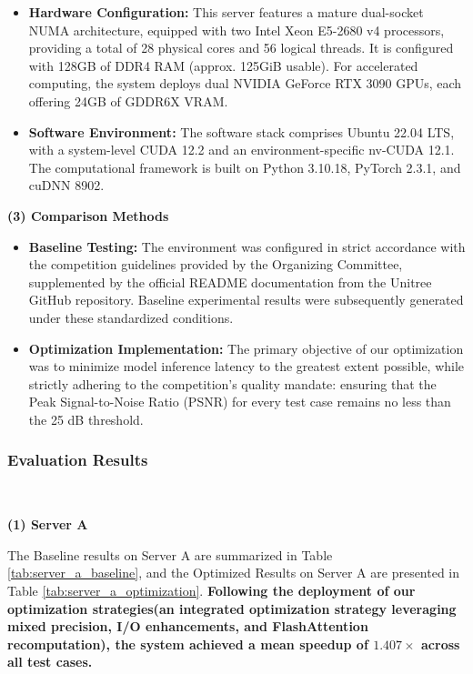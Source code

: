 \begin{itemize}
    \item \textbf{Hardware Configuration:} This server features a mature dual-socket NUMA architecture, equipped with two Intel Xeon E5-2680 v4 processors, providing a total of 28 physical cores and 56 logical threads. It is configured with 128GB of DDR4 RAM (approx. 125GiB usable). For accelerated computing, the system deploys dual NVIDIA GeForce RTX 3090 GPUs, each offering 24GB of GDDR6X VRAM.
    \item \textbf{Software Environment:} The software stack comprises Ubuntu 22.04 LTS, with a system-level CUDA 12.2 and an environment-specific nv-CUDA 12.1. The computational framework is built on Python 3.10.18, PyTorch 2.3.1, and cuDNN 8902.
\end{itemize}

\textbf{(3) Comparison Methods}

\begin{itemize}
    \item \textbf{Baseline Testing:} The environment was configured in strict accordance with the competition guidelines provided by the Organizing Committee, supplemented by the official README documentation from the Unitree GitHub repository. Baseline experimental results were subsequently generated under these standardized conditions.
    \item \textbf{Optimization Implementation:} The primary objective of our optimization was to minimize model inference latency to the greatest extent possible, while strictly adhering to the competition's quality mandate: ensuring that the Peak Signal-to-Noise Ratio (PSNR) for every test case remains no less than the 25 dB threshold.
\end{itemize}


\subsubsection{Evaluation Results}\label{sec:unif exp reult}
\

\textbf{(1) Server A}

The Baseline results on Server A are summarized in Table \ref{tab:server_a_baseline}, and the Optimized Results on Server A are presented in Table \ref{tab:server_a_optimization}.
\textbf{Following the deployment of our optimization strategies(an integrated optimization strategy leveraging mixed precision, I/O enhancements, and FlashAttention recomputation), the system achieved a mean speedup of $1.407 \times$ across all test cases.} 

